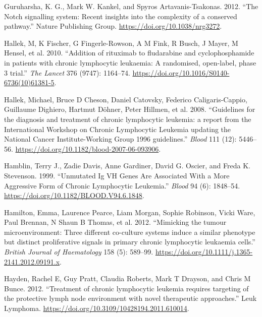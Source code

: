 \documentclass[11pt, a4paper, twosided]{book}
\newenvironment{CSLReferences}%
  {}%
  {\par}
\begin{document}
\begin{CSLReferences}{1}{0}
\leavevmode{}%
Guruharsha, K. G., Mark W. Kankel, and Spyros Artavanis-Tsakonas. 2012. {``{The Notch signalling system: Recent insights into the complexity of a conserved pathway}.''} Nature Publishing Group. \url{https://doi.org/10.1038/nrg3272}.

\leavevmode{}%
Hallek, M, K Fischer, G Fingerle-Rowson, A M Fink, R Busch, J Mayer, M Hensel, et al. 2010. {``{Addition of rituximab to fludarabine and cyclophosphamide in patients with chronic lymphocytic leukaemia: A randomised, open-label, phase 3 trial}.''} \emph{The Lancet} 376 (9747): 1164--74. \url{https://doi.org/10.1016/S0140-6736(10)61381-5}.

\leavevmode{}%
Hallek, Michael, Bruce D Cheson, Daniel Catovsky, Federico Caligaris-Cappio, Guillaume Dighiero, Hartmut Döhner, Peter Hillmen, et al. 2008. {``{Guidelines for the diagnosis and treatment of chronic lymphocytic leukemia: a report from the International Workshop on Chronic Lymphocytic Leukemia updating the National Cancer Institute-Working Group 1996 guidelines.}''} \emph{Blood} 111 (12): 5446--56. \url{https://doi.org/10.1182/blood-2007-06-093906}.

\leavevmode{}%
Hamblin, Terry J., Zadie Davis, Anne Gardiner, David G. Oscier, and Freda K. Stevenson. 1999. {``{Unmutated Ig VH Genes Are Associated With a More Aggressive Form of Chronic Lymphocytic Leukemia}.''} \emph{Blood} 94 (6): 1848--54. \url{https://doi.org/10.1182/BLOOD.V94.6.1848}.

\leavevmode{}%
Hamilton, Emma, Laurence Pearce, Liam Morgan, Sophie Robinson, Vicki Ware, Paul Brennan, N Shaun B Thomas, et al. 2012. {``{Mimicking the tumour microenvironment: Three different co-culture systems induce a similar phenotype but distinct proliferative signals in primary chronic lymphocytic leukaemia cells}.''} \emph{British Journal of Haematology} 158 (5): 589--99. \url{https://doi.org/10.1111/j.1365-2141.2012.09191.x}.

\leavevmode{}%
Hayden, Rachel E, Guy Pratt, Claudia Roberts, Mark T Drayson, and Chris M Bunce. 2012. {``{Treatment of chronic lymphocytic leukemia requires targeting of the protective lymph node environment with novel therapeutic approaches}.''} Leuk Lymphoma. \url{https://doi.org/10.3109/10428194.2011.610014}.


\end{CSLReferences}
\end{document}
